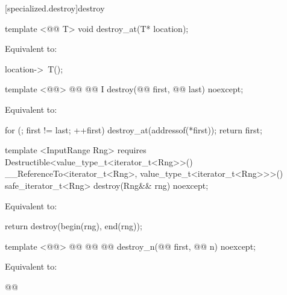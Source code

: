 [specialized.destroy]{destroy}

\begin{codeblock}
  template <@@ T>
    void destroy_at(T* location);
\end{codeblock}

\setcounter{Paras}{0}
\pnum
\effects Equivalent to:

\begin{codeblock}
        location->~T();
\end{codeblock}

\begin{codeblock}
  template <@@>
    @@
             @@
  I destroy(@@ first, @@ last) noexcept;
\end{codeblock}

\pnum
\effects Equivalent to:
\begin{codeblock}
        for (; first != last; ++first)
          destroy_at(addressof(*first));
        return first;
\end{codeblock}

{\color{addclr}
\begin{codeblock}
  template <InputRange Rng>
    requires Destructible<value_type_t<iterator_t<Rng>>()
             __ReferenceTo<iterator_t<Rng>, value_type_t<iterator_t<Rng>>>()
  safe_iterator_t<Rng> destroy(Rng&& rng) noexcept;
\end{codeblock}

\pnum
\effects Equivalent to:
\begin{codeblock}
        return destroy(begin(rng), end(rng));
\end{codeblock}
} %

\begin{codeblock}
  template <@@>
    @@
             @@
  @@ destroy_n(@@ first, @@ n) noexcept;
\end{codeblock}

\pnum
\effects Equivalent to:
\begin{codeblock}
        @@
\end{codeblock}
